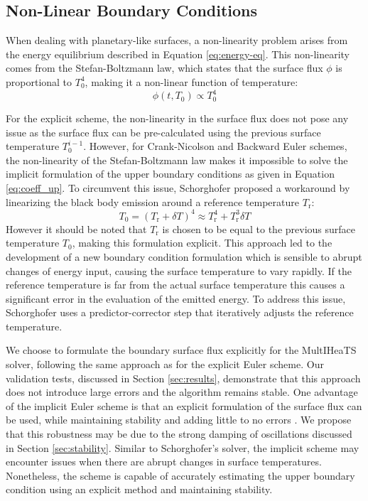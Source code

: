 \documentclass[sn-vancouver, Numbered]{sn-jnl}
\begin{document}
\subsection{Non-Linear Boundary Conditions}

When dealing with planetary-like surfaces, a non-linearity problem arises from the energy equilibrium described in Equation \ref{eq:energy-eq}. This non-linearity comes from the Stefan-Boltzmann law, which states that the surface flux $\phi$ is proportional to $T_0^4$, making it a non-linear function of temperature: 
\begin{equation}
    \phi(t, T_0) \propto T_0^4
\end{equation}

For the explicit scheme, the non-linearity in the surface flux does not pose any issue as the surface flux can be pre-calculated using the previous surface temperature $T_{0}^{i-1}$. However, for Crank-Nicolson and Backward Euler schemes, the non-linearity of the Stefan-Boltzmann law makes it impossible to solve the implicit formulation of the upper boundary conditions as given in Equation \ref{eq:coeff_up}. To circumvent this issue, Schorghofer proposed a workaround \cite{Schorghofer2010} by linearizing the black body emission around a reference temperature $T_{\mathrm{r}}$:
\begin{equation}
T_0 = \left( T_{\mathrm{r}} + \delta T \right)^4 \approx T_{\mathrm{r}}^4 + T_{\mathrm{r}}^3 \delta T
\end{equation}
However it should be noted that $T_{\mathrm{r}}$ is chosen to be equal to the previous surface temperature $T_0$, making this formulation explicit.
This approach led to the development of a new boundary condition formulation which is sensible to abrupt changes of energy input, causing the surface temperature to vary rapidly.
If the reference temperature is far from the actual surface temperature this causes a significant error in the evaluation of the emitted energy. To address this issue, Schorghofer \cite{Schorghofer2010} uses a predictor-corrector step that iteratively adjusts the reference temperature.


We choose to formulate the boundary surface flux explicitly for the MultIHeaTS solver, following the same approach as for the explicit Euler scheme. Our validation tests, discussed in Section \ref{sec:results}, demonstrate that this approach does not introduce large errors and the algorithm remains stable.
One advantage of the implicit Euler scheme is that an explicit formulation of the surface flux can be used, while maintaining stability and adding little to no errors \cite{Beam1982}. We propose that this robustness may be due to the strong damping of oscillations discussed in Section \ref{sec:stability}. 
Similar to Schorghofer's solver, the implicit scheme may encounter issues when there are abrupt changes in surface temperatures. Nonetheless, the scheme is capable of accurately estimating the upper boundary condition using an explicit method and maintaining stability.
\end{document}
